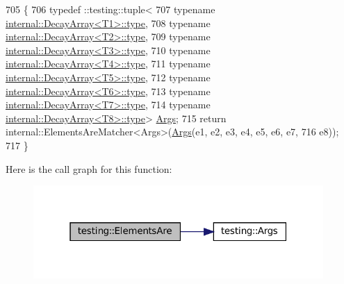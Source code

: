 \begin{DoxyCode}
705                                                             \{
706   typedef ::testing::tuple<
707       \textcolor{keyword}{typename} \hyperlink{namespacegenerate__debs_a50bc9a7ecac9584553e089a448bcde58}{internal::DecayArray<T1>::type},
708       \textcolor{keyword}{typename} \hyperlink{namespacegenerate__debs_a50bc9a7ecac9584553e089a448bcde58}{internal::DecayArray<T2>::type},
709       \textcolor{keyword}{typename} \hyperlink{namespacegenerate__debs_a50bc9a7ecac9584553e089a448bcde58}{internal::DecayArray<T3>::type},
710       \textcolor{keyword}{typename} \hyperlink{namespacegenerate__debs_a50bc9a7ecac9584553e089a448bcde58}{internal::DecayArray<T4>::type},
711       \textcolor{keyword}{typename} \hyperlink{namespacegenerate__debs_a50bc9a7ecac9584553e089a448bcde58}{internal::DecayArray<T5>::type},
712       \textcolor{keyword}{typename} \hyperlink{namespacegenerate__debs_a50bc9a7ecac9584553e089a448bcde58}{internal::DecayArray<T6>::type},
713       \textcolor{keyword}{typename} \hyperlink{namespacegenerate__debs_a50bc9a7ecac9584553e089a448bcde58}{internal::DecayArray<T7>::type},
714       \textcolor{keyword}{typename} \hyperlink{namespacegenerate__debs_a50bc9a7ecac9584553e089a448bcde58}{internal::DecayArray<T8>::type}> 
      \hyperlink{namespacetesting_a09ac462e8d6ed468cbfaa9c767aee0aa}{Args};
715   \textcolor{keywordflow}{return} internal::ElementsAreMatcher<Args>(\hyperlink{namespacetesting_a09ac462e8d6ed468cbfaa9c767aee0aa}{Args}(e1, e2, e3, e4, e5, e6, e7,
716       e8));
717 \}
\end{DoxyCode}
Here is the call graph for this function\+:
\nopagebreak
\begin{figure}[H]
\begin{center}
\leavevmode
\includegraphics[width=313pt]{namespacetesting_a8d498031827c1d089dc84f5f14b7df12_cgraph}
\end{center}
\end{figure}
\mbox{\label{namespacetesting_aa39ad709c933dbbbe3cbaececa8b4577}} 
